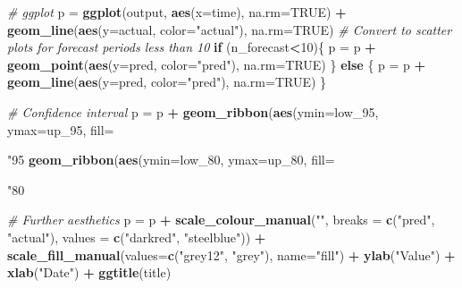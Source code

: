 \documentclass[
  11pt,
]{article}
\newenvironment{Shaded}{\begin{snugshade}}{\end{snugshade}}
\newcommand{\CommentTok}[1]{\textcolor[rgb]{0.56,0.35,0.01}{\textit{#1}}}
\newcommand{\ControlFlowTok}[1]{\textcolor[rgb]{0.13,0.29,0.53}{\textbf{#1}}}
\newcommand{\DataTypeTok}[1]{\textcolor[rgb]{0.13,0.29,0.53}{#1}}
\newcommand{\DecValTok}[1]{\textcolor[rgb]{0.00,0.00,0.81}{#1}}
\newcommand{\FloatTok}[1]{\textcolor[rgb]{0.00,0.00,0.81}{#1}}
\newcommand{\KeywordTok}[1]{\textcolor[rgb]{0.13,0.29,0.53}{\textbf{#1}}}
\newcommand{\NormalTok}[1]{#1}
\newcommand{\OperatorTok}[1]{\textcolor[rgb]{0.81,0.36,0.00}{\textbf{#1}}}
\newcommand{\OtherTok}[1]{\textcolor[rgb]{0.56,0.35,0.01}{#1}}
\newcommand{\StringTok}[1]{\textcolor[rgb]{0.31,0.60,0.02}{#1}}
\begin{document}
\begin{Shaded}
\begin{Highlighting}[]
{  \CommentTok{# ggplot}
\NormalTok{  p =}\StringTok{ }\KeywordTok{ggplot}\NormalTok{(output, }\KeywordTok{aes}\NormalTok{(}\DataTypeTok{x=}\NormalTok{time), }\DataTypeTok{na.rm=}\OtherTok{TRUE}\NormalTok{) }\OperatorTok{+}\StringTok{  }\KeywordTok{geom_line}\NormalTok{(}\KeywordTok{aes}\NormalTok{(}\DataTypeTok{y=}\NormalTok{actual, }\DataTypeTok{color=}\StringTok{"actual"}\NormalTok{), }\DataTypeTok{na.rm=}\OtherTok{TRUE}\NormalTok{)}
  \CommentTok{# Convert to scatter plots for forecast periods less than 10}
    \ControlFlowTok{if}\NormalTok{ (n_forecast}\OperatorTok{<}\DecValTok{10}\NormalTok{)\{}
\NormalTok{      p =}\StringTok{ }\NormalTok{p }\OperatorTok{+}\StringTok{ }\KeywordTok{geom_point}\NormalTok{(}\KeywordTok{aes}\NormalTok{(}\DataTypeTok{y=}\NormalTok{pred, }\DataTypeTok{color=}\StringTok{"pred"}\NormalTok{), }\DataTypeTok{na.rm=}\OtherTok{TRUE}\NormalTok{)}
\NormalTok{      \} }\ControlFlowTok{else}\NormalTok{ \{}
\NormalTok{        p =}\StringTok{ }\NormalTok{p }\OperatorTok{+}\StringTok{ }\KeywordTok{geom_line}\NormalTok{(}\KeywordTok{aes}\NormalTok{(}\DataTypeTok{y=}\NormalTok{pred, }\DataTypeTok{color=}\StringTok{"pred"}\NormalTok{), }\DataTypeTok{na.rm=}\OtherTok{TRUE}\NormalTok{)}
\NormalTok{      \}}
  
  \CommentTok{# Confidence interval }
\NormalTok{  p =}\StringTok{ }\NormalTok{p }\OperatorTok{+}
\StringTok{    }\KeywordTok{geom_ribbon}\NormalTok{(}\KeywordTok{aes}\NormalTok{(}\DataTypeTok{ymin=}\NormalTok{low_}\DecValTok{95}\NormalTok{, }\DataTypeTok{ymax=}\NormalTok{up_}\DecValTok{95}\NormalTok{, }\DataTypeTok{fill=}\StringTok{"95%
\StringTok{    }\KeywordTok{geom_ribbon}\NormalTok{(}\KeywordTok{aes}\NormalTok{(}\DataTypeTok{ymin=}\NormalTok{low_}\DecValTok{80}\NormalTok{, }\DataTypeTok{ymax=}\NormalTok{up_}\DecValTok{80}\NormalTok{, }\DataTypeTok{fill=}\StringTok{"80%
  
  \CommentTok{# Further aesthetics}
\NormalTok{  p =}\StringTok{ }\NormalTok{p }\OperatorTok{+}
\StringTok{    }\KeywordTok{scale_colour_manual}\NormalTok{(}\StringTok{""}\NormalTok{, }
                        \DataTypeTok{breaks =} \KeywordTok{c}\NormalTok{(}\StringTok{"pred"}\NormalTok{, }\StringTok{"actual"}\NormalTok{),}
                        \DataTypeTok{values =} \KeywordTok{c}\NormalTok{(}\StringTok{"darkred"}\NormalTok{, }\StringTok{"steelblue"}\NormalTok{)) }\OperatorTok{+}\StringTok{ }
\StringTok{    }\KeywordTok{scale_fill_manual}\NormalTok{(}\DataTypeTok{values=}\KeywordTok{c}\NormalTok{(}\StringTok{"grey12"}\NormalTok{, }\StringTok{"grey"}\NormalTok{), }\DataTypeTok{name=}\StringTok{"fill"}\NormalTok{) }\OperatorTok{+}\StringTok{ }
\StringTok{    }\KeywordTok{ylab}\NormalTok{(}\StringTok{"Value"}\NormalTok{) }\OperatorTok{+}\StringTok{ }\KeywordTok{xlab}\NormalTok{(}\StringTok{"Date"}\NormalTok{) }\OperatorTok{+}\StringTok{ }\KeywordTok{ggtitle}\NormalTok{(title)}
  
}}}
\end{Highlighting}
\end{Shaded}
\end{document}
